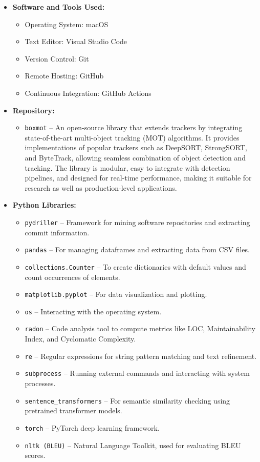 \documentclass[12pt, a4paper]{report}
\begin{document}
\begin{itemize}
    \item \textbf{Software and Tools Used:}
    \begin{itemize}
        \item Operating System: macOS
        \item Text Editor: Visual Studio Code
        \item Version Control: Git
        \item Remote Hosting: GitHub
        \item Continuous Integration: GitHub Actions
    \end{itemize}
    
    \item \textbf{Repository:}
    \begin{itemize}
        \item \texttt{boxmot} -- An open-source library that extends trackers by integrating state-of-the-art multi-object tracking (MOT) algorithms. It provides implementations of popular trackers such as DeepSORT, StrongSORT, and ByteTrack, allowing seamless combination of object detection and tracking. The library is modular, easy to integrate with detection pipelines, and designed for real-time performance, making it suitable for research as well as production-level applications.
    \end{itemize}
    
    \item \textbf{Python Libraries:}
    \begin{itemize}
        \item \texttt{pydriller} -- Framework for mining software repositories and extracting commit information.
        \item \texttt{pandas} -- For managing dataframes and extracting data from CSV files.
        \item \texttt{collections.Counter} -- To create dictionaries with default values and count occurrences of elements.
        \item \texttt{matplotlib.pyplot} -- For data visualization and plotting.
        \item \texttt{os} -- Interacting with the operating system.
        \item \texttt{radon} -- Code analysis tool to compute metrics like LOC, Maintainability Index, and Cyclomatic Complexity.
        \item \texttt{re} -- Regular expressions for string pattern matching and text refinement.
        \item \texttt{subprocess} -- Running external commands and interacting with system processes.
        \item \texttt{sentence\_transformers} -- For semantic similarity checking using pretrained transformer models.
        \item \texttt{torch} -- PyTorch deep learning framework.
        \item \texttt{nltk (BLEU)} -- Natural Language Toolkit, used for evaluating BLEU scores.
    \end{itemize}
\end{itemize}
\end{document}
